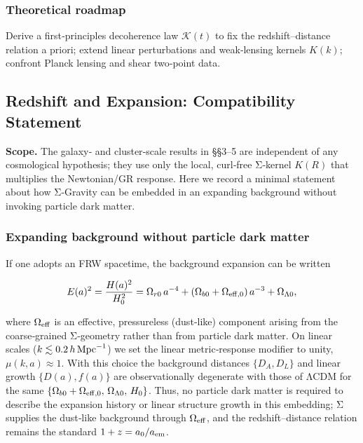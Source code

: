 \documentclass[11pt,a4paper]{article}
\begin{document}
\subsubsection{Theoretical roadmap}


Derive a first‑principles decoherence law $\mathcal{K}(t)$ to fix the redshift–distance relation a priori; extend linear perturbations and weak‑lensing kernels $K(k)$; confront Planck lensing and shear two‑point data.


\subsection{Redshift and Expansion: Compatibility Statement}


\textbf{Scope.} The galaxy‑ and cluster‑scale results in §§3–5 are independent of any cosmological hypothesis; they use only the local, curl‑free Σ‑kernel $K(R)$ that multiplies the Newtonian/GR response. Here we record a minimal statement about how Σ‑Gravity can be embedded in an expanding background without invoking particle dark matter.


\subsubsection{Expanding background without particle dark matter}


If one adopts an FRW spacetime, the background expansion can be written


\begin{equation}
E(a)^2 = \frac{H(a)^2}{H_0^2} = \Omega_{r0}\,a^{-4} + (\Omega_{b0} + \Omega_{\rm eff,0})\,a^{-3} + \Omega_{\Lambda 0},
\end{equation}


where $\Omega_{\rm eff}$ is an effective, pressureless (dust‑like) component arising from the coarse‑grained Σ‑geometry rather than from particle dark matter. On linear scales ($k \lesssim 0.2\,h\,{\rm Mpc}^{-1}$) we set the linear metric‑response modifier to unity, $\mu(k,a) \approx 1$. With this choice the background distances $\{D_A, D_L\}$ and linear growth $\{D(a), f(a)\}$ are observationally degenerate with those of ΛCDM for the same $\{\Omega_{b0} + \Omega_{\rm eff,0},\, \Omega_{\Lambda 0},\, H_0\}$. Thus, no particle dark matter is required to describe the expansion history or linear structure growth in this embedding; Σ supplies the dust‑like background through $\Omega_{\rm eff}$, and the redshift–distance relation remains the standard $1+z = a_0/a_{\rm em}$.
\end{document}
